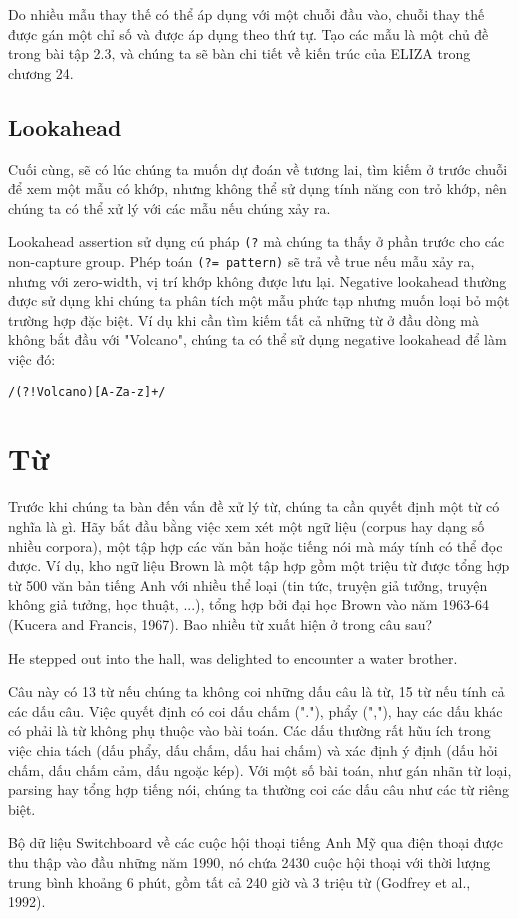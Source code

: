 Do nhiều mẫu thay thế có thể áp dụng với một chuỗi đầu vào, chuỗi thay thế được gán một chỉ số và được áp dụng theo thứ tự. Tạo các mẫu là một chủ đề trong bài tập 2.3, và chúng ta sẽ bàn chi tiết về kiến trúc của ELIZA trong chương 24.

\vspace{20em}

\subsection{Lookahead}

Cuối cùng, sẽ có lúc chúng ta muốn dự đoán về tương lai, tìm kiếm ở trước chuỗi để xem một mẫu có khớp, nhưng không thể sử dụng tính năng con trỏ khớp, nên chúng ta có thể xử lý với các mẫu nếu chúng xảy ra.

Lookahead assertion sử dụng cú pháp \verb|(?| mà chúng ta thấy ở phần trước cho các non-capture group.
Phép toán \verb|(?= pattern)| sẽ trả về true nếu mẫu xảy ra, nhưng với zero-width, vị trí khớp không được lưu lại.
Negative lookahead thường được sử dụng khi chúng ta phân tích một mẫu phức tạp nhưng muốn loại bỏ một trường hợp đặc biệt.
Ví dụ khi cần tìm kiếm tất cả những từ ở đầu dòng mà không bắt đầu với "Volcano", chúng ta có thể sử dụng negative lookahead để làm việc đó:

\vspace{0.6em}

\noindent \texttt{/(?!Volcano)[A-Za-z]+/}

\vspace{0.6em}

\section{Từ}

Trước khi chúng ta bàn đến vấn đề xử lý từ, chúng ta cần quyết định một từ có nghĩa là gì. Hãy bắt đầu bằng việc xem xét một ngữ liệu (corpus hay dạng số nhiều corpora), một tập hợp các văn bản hoặc tiếng nói mà máy tính có thể đọc được. Ví dụ, kho ngữ liệu Brown là một tập hợp gồm một triệu từ được tổng hợp từ 500 văn bản tiếng Anh với nhiều thể loại (tin tức, truyện giả tưởng, truyện không giả tưởng, học thuật, ...), tổng hợp bởi đại học Brown vào năm 1963-64 (Kucera and Francis, 1967). Bao nhiều từ xuất hiện ở trong câu sau?

\hspace{0.8cm} He stepped out into the hall, was delighted to encounter a water brother.

Câu này có 13 từ nếu chúng ta không coi những dấu câu là từ, 15 từ nếu tính cả các dấu câu. Việc quyết định có coi dấu chấm ("."), phẩy (","), hay các dấu khác có phải là từ không phụ thuộc vào bài toán. Các dấu thường rất hũu ích trong việc chia tách (dấu phẩy, dấu chấm, dấu hai chấm) và xác định ý định (dấu hỏi chấm, dấu chấm cảm, dấu ngoặc kép). Với một số bài toán, như gán nhãn từ loại, parsing hay tổng hợp tiếng nói, chúng ta thường coi các dấu câu như các từ riêng biệt.

Bộ dữ liệu Switchboard về các cuộc hội thoại tiếng Anh Mỹ qua điện thoại được thu thập vào đầu những năm 1990, nó chứa 2430 cuộc hội thoại với thời lượng trung bình khoảng 6 phút, gồm tất cả 240 giờ và 3 triệu từ (Godfrey et al., 1992).